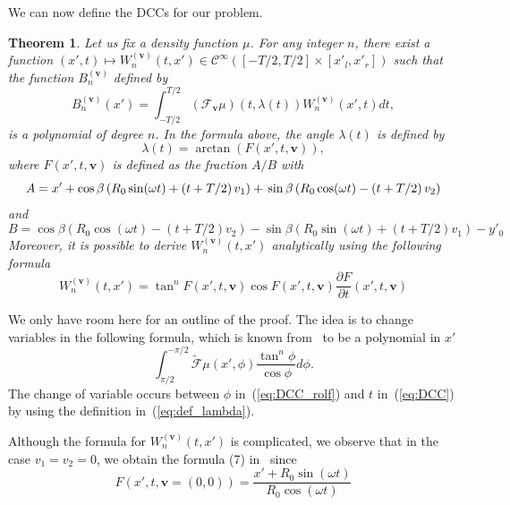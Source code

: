 \documentclass[twocolumn]{IEEEtran}
\newcommand{\Cinf}{\mathcal{C}^{\infty}}
\newcommand{\bv}{\mathbf{v}}
\newcommand{\Tbv}{\mathcal{F}_{\mathbf{v}}}
\newcommand{\Bnv}{B_n^{(\bv)}}
\newcommand{\Wnv}{W_n^{(\bv)}}
\newtheorem{theorem}{Theorem}
\begin{document}
We can now define the DCCs for our problem.
\begin{theorem}
\label{theo:main}
Let us fix a density function $\mu$. For any integer $n$, there exist a function $(x',t)\mapsto \Wnv(t,x') \in \Cinf \left( [-T/2,T/2] \times [x'_l,x'_r] \right)$ such that the function $\Bnv$ defined by
\begin{equation}
	\Bnv(x') = \int_{-T/2}^{T/2} \left( \Tbv \mu \right)\left( t,\lambda(t) \right) \Wnv(x',t) dt,
\label{eq:DCC}
\end{equation}
is a polynomial of degree $n$. In the formula above, the angle $\lambda(t)$ is defined by
\begin{equation}
	\lambda(t) = \arctan \left( F(x',t,\bv) \right),
\label{eq:def_lambda}
\end{equation}
where $F(x',t,\bv)$ is defined as the fraction $A/B$ with
\begin{dmath}
	A = x' + \cos \beta \left( R_0 \sin(\omega t) + \left( t + T/2 \right)v_1 \right) + \\
	\sin \beta \left( R_0 \cos(\omega t) - \left( t + T/2 \right)v_2 \right)
\end{dmath}
and
\begin{dmath}
	B = \cos \beta \left( R_0 \cos(\omega t) - \left( t + T/2 \right)v_2 \right) - \sin \beta \left( R_0 \sin(\omega t) + \left( t + T/2 \right)v_1 \right) - y'_0 
\end{dmath}
Moreover, it is possible to derive $\Wnv(t,x')$ analytically using the following formula
\begin{equation}
	\Wnv(t,x') = \tan^n F(x',t,\bv) \cos F(x',t,\bv) \frac{\partial F}{\partial t} (x',t,\bv)
\end{equation}
\end{theorem}

We only have room here for an outline of the proof. The idea is to change variables in the following formula, which is known from~\cite{clackdoyle2013necessary} to be a polynomial in $x'$
\begin{equation}
	\int_{\pi/2}^{-\pi/2} \tilde{\mathcal{F}}\mu (x',\phi) \frac{\tan^n \phi}{\cos \phi} d\phi.
\label{eq:DCC_rolf}
\end{equation}
The change of variable occurs between $\phi$ in~(\ref{eq:DCC_rolf}) and $t$ in~(\ref{eq:DCC}) by using the definition in~(\ref{eq:def_lambda}).

Although the formula for $\Wnv(t,x')$ is complicated, we observe that in the case $v_1=v_2=0$, we obtain the formula (7) in~\cite{clackdoyle2015consistency} since
\begin{equation}
	F \left( x',t,\bv = (0,0) \right) = \frac{x' + R_0 \sin(\omega t)}{R_0 \cos(\omega t)}
\end{equation}
\end{document}
